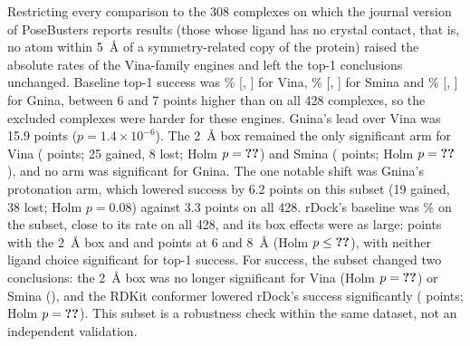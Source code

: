 Restricting every comparison to the 308 complexes on which the journal version of
PoseBusters reports results (those whose ligand has no crystal contact, that is, no atom
within \SI{5}{\angstrom} of a symmetry-related copy of the protein)
raised the absolute rates of the Vina-family engines and left the top-1 conclusions
unchanged. Baseline top-1 success was
\% [, ] for Vina, \% [, ] for Smina and \% [, ] for
Gnina, between 6 and 7 points higher than on all 428 complexes, so the excluded complexes
were harder for these engines. Gnina's lead over Vina was 15.9 points
($p = 1.4 \times 10^{-6}$). The \SI{2}{\angstrom} box remained the only significant arm
for Vina ( points; 25 gained, 8 lost; Holm $p = \val{subset_308/comparisons/vina/top1/box_padding_2/p_holm}$) and Smina ( points; Holm
$p = \val{subset_308/comparisons/smina/top1/box_padding_2/p_holm}$), and no arm was significant for Gnina. The one notable shift was Gnina's
protonation arm, which lowered success by 6.2 points on this subset (19 gained, 38 lost;
Holm $p = 0.08$) against 3.3 points on all 428. rDock's baseline was \% on the
subset, close to its rate on all 428, and its box effects were as large:  points with
the \SI{2}{\angstrom} box and  and  points at 6 and \SI{8}{\angstrom} (Holm
$p \le \val{subset_308/comparisons/rdock/top1/box_padding_6/p_holm}$), with neither ligand choice significant for top-1 success.
For \pbvalid{} success, the subset changed two conclusions: the \SI{2}{\angstrom} box was no
longer significant for Vina (Holm $p = \val{subset_308/comparisons/vina/pb_valid/box_padding_2/p_holm}$) or Smina (), and the RDKit conformer
lowered rDock's \pbvalid{} success significantly ( points; Holm $p = \val{subset_308/comparisons/rdock/pb_valid/ligand_rdkit_conformer/p_holm}$).
This subset is a robustness check within the same dataset, not an independent validation.

